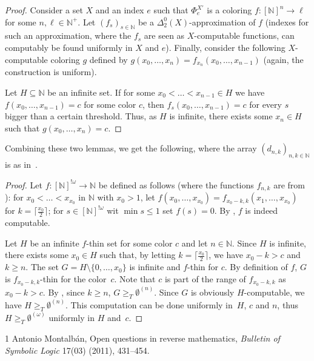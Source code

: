 \documentclass[10pt,a4paper]{article}
\newcommand{\NN}[0]{\mathbb{N}}
\numberwithin{theorem}{section}
\newtheorem{lemma}[theorem]{Lemma}
\begin{document}
\begin{proof}
Consider a set $X$ and an index $e$ such that $\Phi_e^{X'}$ is a coloring $f : [\NN]^n \to \ell$ for some $n, \ell \in \NN^+$. Let $(f_s)_{s\in \NN}$ be a $\Delta_2^0(X)$-approximation of $f$ (indexes for such an approximation, where the $f_s$ are seen as $X$-computable functions, can computably be found uniformly in $X$ and $e$). Finally, consider the following $X$-computable coloring $g$ defined by $g(x_0, \dots, x_{n}) = f_{x_n}(x_0, \dots, x_{n-1})$ (again, the construction is uniform).

Let $H \subseteq \NN$ be an infinite set. If for some $x_0 < \dots < x_{n-1} \in H$ we have $f(x_0, \dots, x_{n-1}) = c$ for some color $c$, then $f_s(x_0, \dots, x_{n-1}) = c$ for every $s$ bigger than a certain threshold. Thus, as $H$ is infinite, there exists some $x_n \in H$ such that $g(x_0, \dots, x_n) = c$.  
\end{proof}

Combining these two lemmas, we get the following, where the array $(d_{n,k})_{n,k\in\NN}$ is as in~.


\begin{proof}
Let $f : [\NN]^{!\omega} \to \NN$ be defined as follows (where the functions $f_{n,k}$ are from ): for $x_0 < \dots < x_{x_0}$ in $\NN$ with $x_0 > 1$, let $f(x_0, \dots, x_{x_0})= f_{x_0 - k, k}(x_1, \dots, x_{x_0})$ for $k = \lceil \frac{x_0}{2} \rceil$; for $s \in [\NN]^{!\omega}$ wit $\min s \leq 1$ set $f(s) = 0$. By , $f$ is indeed computable.

Let $H$ be an infinite $f$-thin set for some color $c$ and let $n \in \NN$. Since $H$ is infinite, there exists some $x_0 \in H$ such that, by letting $k = \lceil \frac{x_0}{2} \rceil$, we have $x_0 - k > c$ and $k \geq n$. The set $G = H \setminus \{0, \dots, x_0\}$ is infinite and $f$-thin for $c$. By definition of $f$, $G$ is $f_{x_0 - k, k}$-thin for the color~$c$. Note that $c$ is part of the range of $f_{x_0 - k, k}$ as $x_0 - k > c$. By , since $k \geq n$, $G \geq_T \emptyset^{(n)}$. Since $G$ is obviously $H$-computable, we have $H\geq_T \emptyset^{(n)}$.
This computation can be done uniformly in~$H$, $c$ and $n$, thus $H \geq_T \emptyset^{(\omega)}$ uniformly in $H$ and~$c$.
\end{proof}

\begin{thebibliography}{1}
 Antonio Montalb\'an, Open questions in reverse mathematics,
\emph{Bulletin of Symbolic Logic} 17(03) (2011), 431--454.
\end{thebibliography}
\end{document}
